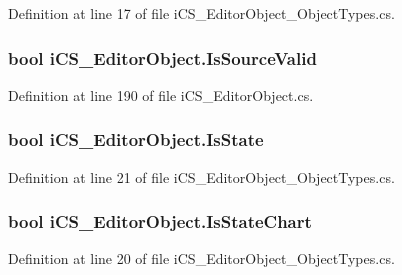Definition at line 17 of file i\+C\+S\+\_\+\+Editor\+Object\+\_\+\+Object\+Types.\+cs.

\hypertarget{classi_c_s___editor_object_aa1a0097087ff84f9c2a6577a2dcb35df}{
\subsubsection[{Is\+Source\+Valid}]{\setlength{\rightskip}{0pt plus 5cm}bool i\+C\+S\+\_\+\+Editor\+Object.\+Is\+Source\+Valid\hspace{0.3cm}{\ttfamily [get]}}}\label{classi_c_s___editor_object_aa1a0097087ff84f9c2a6577a2dcb35df}


Definition at line 190 of file i\+C\+S\+\_\+\+Editor\+Object.\+cs.

\hypertarget{classi_c_s___editor_object_a782f1536bab33ded1afc47826331b830}{
\subsubsection[{Is\+State}]{\setlength{\rightskip}{0pt plus 5cm}bool i\+C\+S\+\_\+\+Editor\+Object.\+Is\+State\hspace{0.3cm}{\ttfamily [get]}}}\label{classi_c_s___editor_object_a782f1536bab33ded1afc47826331b830}


Definition at line 21 of file i\+C\+S\+\_\+\+Editor\+Object\+\_\+\+Object\+Types.\+cs.

\hypertarget{classi_c_s___editor_object_a39181df03560f0f119ff87408288dc84}{
\subsubsection[{Is\+State\+Chart}]{\setlength{\rightskip}{0pt plus 5cm}bool i\+C\+S\+\_\+\+Editor\+Object.\+Is\+State\+Chart\hspace{0.3cm}{\ttfamily [get]}}}\label{classi_c_s___editor_object_a39181df03560f0f119ff87408288dc84}


Definition at line 20 of file i\+C\+S\+\_\+\+Editor\+Object\+\_\+\+Object\+Types.\+cs.

